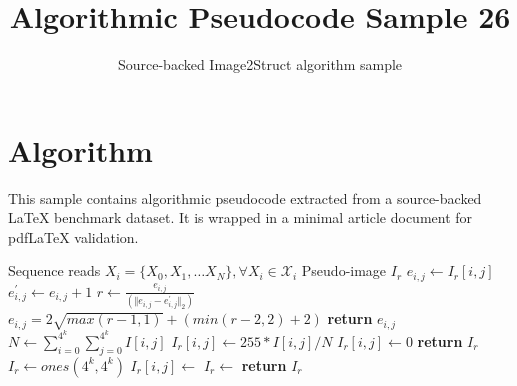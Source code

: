 \documentclass[11pt]{article}
\title{Algorithmic Pseudocode Sample 26}
\author{Source-backed Image2Struct algorithm sample}
\date{}
\begin{document}
\maketitle
\section{Algorithm}
This sample contains algorithmic pseudocode extracted from a source-backed LaTeX benchmark dataset. It is wrapped in a minimal article document for pdfLaTeX validation.

\begin{algorithm}[htbp]
\caption{Source-backed algorithmic procedure}
\begin{algorithmic}
\Require Sequence reads $X_i = \{X_0, X_1, \ldots X_N\}, \forall X_i \in \mathcal{X}_i$
\Ensure Pseudo-image $I_r$
\State $e_{i,j} \gets I_r[i,j]$ 
\State $e^\prime_{i,j} \gets e_{i,j} + 1$ 
\State $r \gets \frac{e_{i,j}}{(\Vert e_{i,j} - e^{\prime}_{i,j} \Vert_2)}$ 
\State $e_{i,j} = 2 \sqrt{max(r - 1, 1)} + (min(r-2,2) + 2)$
\State \textbf{return} $e_{i,j}$
\EndProcedure
{}
\State $N\gets\sum_{i=0}^{4^k}{\sum_{j=0}^{4^k}{I[i,j]}}$
\State$I_r[i,j]\gets 255*I[i,j]/N$
\Else
\State$I_r[i,j]\gets 0$
\EndIf
\EndFor
\EndFor
\State \textbf{return} $I_r$
\EndProcedure
\State $I_r \gets ones(4^k,4^k)$ 
 
 
\State $I_r[i,j]\gets$
\EndFor
\EndFor
\State $I_r\gets$ 
\State \textbf{return} $I_r$
\end{algorithmic}
\end{algorithm}
\end{document}
